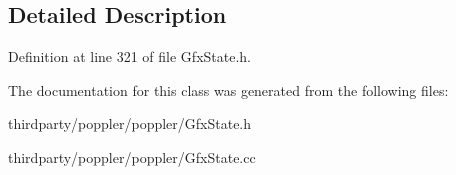 \subsection{Detailed Description}


Definition at line 321 of file Gfx\+State.\+h.



The documentation for this class was generated from the following files\+:\begin{DoxyCompactItemize}
\item 
thirdparty/poppler/poppler/Gfx\+State.\+h\item 
thirdparty/poppler/poppler/Gfx\+State.\+cc\end{DoxyCompactItemize}
